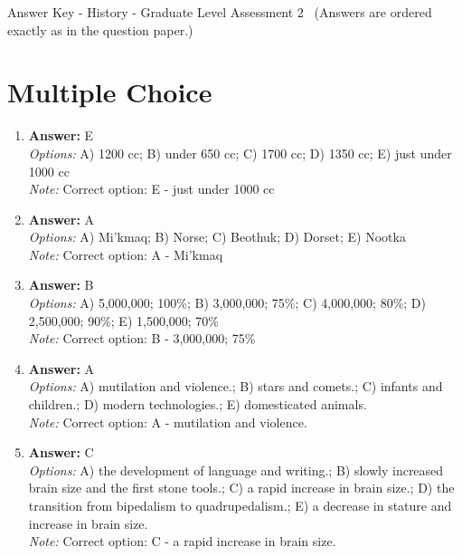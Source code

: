 \documentclass[12pt]{article}
\begin{document}
\begin{center}
Answer Key - History - Graduate Level Assessment 2 \
\small (Answers are ordered exactly as in the question paper.)
\end{center}

\section*{Multiple Choice}
\begin{enumerate}[label=\arabic*.]
\item \textbf{Answer:} E
\\ \textit{Options:} A) 1200 cc; B) under 650 cc; C) 1700 cc; D) 1350 cc; E) just under 1000 cc
\\ \textit{Note:} Correct option: E - just under 1000 cc
\item \textbf{Answer:} A
\\ \textit{Options:} A) Mi'kmaq; B) Norse; C) Beothuk; D) Dorset; E) Nootka
\\ \textit{Note:} Correct option: A - Mi'kmaq
\item \textbf{Answer:} B
\\ \textit{Options:} A) 5,000,000; 100\%; B) 3,000,000; 75\%; C) 4,000,000; 80\%; D) 2,500,000; 90\%; E) 1,500,000; 70\%
\\ \textit{Note:} Correct option: B - 3,000,000; 75\%
\item \textbf{Answer:} A
\\ \textit{Options:} A) mutilation and violence.; B) stars and comets.; C) infants and children.; D) modern technologies.; E) domesticated animals.
\\ \textit{Note:} Correct option: A - mutilation and violence.
\item \textbf{Answer:} C
\\ \textit{Options:} A) the development of language and writing.; B) slowly increased brain size and the first stone tools.; C) a rapid increase in brain size.; D) the transition from bipedalism to quadrupedalism.; E) a decrease in stature and increase in brain size.
\\ \textit{Note:} Correct option: C - a rapid increase in brain size.
\end{enumerate}
\end{document}
